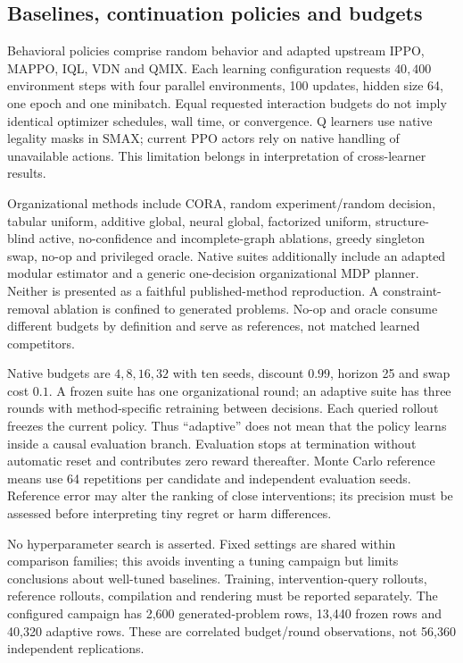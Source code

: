 \documentclass[runningheads]{llncs}
\begin{document}
\subsection{Baselines, continuation policies and budgets}
Behavioral policies comprise random behavior and adapted upstream IPPO, MAPPO, IQL, VDN and QMIX. Each learning configuration requests $40{,}400$ environment steps with four parallel environments, 100 updates, hidden size 64, one epoch and one minibatch. Equal requested interaction budgets do not imply identical optimizer schedules, wall time, or convergence. Q learners use native legality masks in SMAX; current PPO actors rely on native handling of unavailable actions. This limitation belongs in interpretation of cross-learner results.

Organizational methods include CORA, random experiment/random decision, tabular uniform, additive global, neural global, factorized uniform, structure-blind active, no-confidence and incomplete-graph ablations, greedy singleton swap, no-op and privileged oracle. Native suites additionally include an adapted modular estimator and a generic one-decision organizational MDP planner. Neither is presented as a faithful published-method reproduction. A constraint-removal ablation is confined to generated problems. No-op and oracle consume different budgets by definition and serve as references, not matched learned competitors.

Native budgets are $4,8,16,32$ with ten seeds, discount $0.99$, horizon 25 and swap cost $0.1$. A frozen suite has one organizational round; an adaptive suite has three rounds with method-specific retraining between decisions. Each queried rollout freezes the current policy. Thus ``adaptive'' does not mean that the policy learns inside a causal evaluation branch. Evaluation stops at termination without automatic reset and contributes zero reward thereafter. Monte Carlo reference means use 64 repetitions per candidate and independent evaluation seeds. Reference error may alter the ranking of close interventions; its precision must be assessed before interpreting tiny regret or harm differences.

No hyperparameter search is asserted. Fixed settings are shared within comparison families; this avoids inventing a tuning campaign but limits conclusions about well-tuned baselines. Training, intervention-query rollouts, reference rollouts, compilation and rendering must be reported separately. The configured campaign has 2,600 generated-problem rows, 13,440 frozen rows and 40,320 adaptive rows. These are correlated budget/round observations, not 56,360 independent replications.
\end{document}
